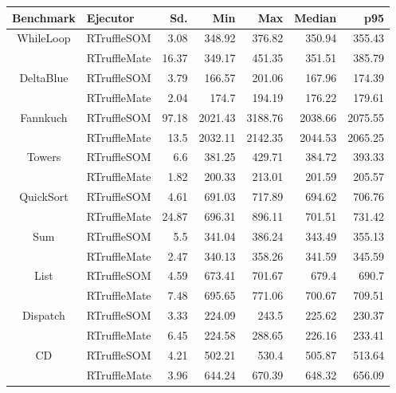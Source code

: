 \begin{center}
\begin{tabular}{ c | l r r r r r}
\toprule
\textbf{Benchmark} & \textbf{Ejecutor} & \textbf{Sd.} & \textbf{Min} & \textbf{Max} & \textbf{Median} & \textbf{p95}\\
\toprule

\multirow{2}{*}{ WhileLoop } & RTruffleSOM & 3.08 & 348.92 & 376.82 & 350.94 & 355.43 \\
& RTruffleMate & 16.37 & 349.17 & 451.35 & 351.51 & 385.79 \\
\midrule

\multirow{2}{*}{ DeltaBlue } & RTruffleSOM & 3.79 & 166.57 & 201.06 & 167.96 & 174.39 \\
& RTruffleMate & 2.04 & 174.7 & 194.19 & 176.22 & 179.61 \\
\midrule

\multirow{2}{*}{ Fannkuch } & RTruffleSOM & 97.18 & 2021.43 & 3188.76 & 2038.66 & 2075.55 \\
& RTruffleMate & 13.5 & 2032.11 & 2142.35 & 2044.53 & 2065.25 \\
\midrule

\multirow{2}{*}{ Towers } & RTruffleSOM & 6.6 & 381.25 & 429.71 & 384.72 & 393.33 \\
& RTruffleMate & 1.82 & 200.33 & 213.01 & 201.59 & 205.57 \\
\midrule

\multirow{2}{*}{ QuickSort } & RTruffleSOM & 4.61 & 691.03 & 717.89 & 694.62 & 706.76 \\
& RTruffleMate & 24.87 & 696.31 & 896.11 & 701.51 & 731.42 \\
\midrule

\multirow{2}{*}{ Sum } & RTruffleSOM & 5.5 & 341.04 & 386.24 & 343.49 & 355.13 \\
& RTruffleMate & 2.47 & 340.13 & 358.26 & 341.59 & 345.59 \\
\midrule

\multirow{2}{*}{ List } & RTruffleSOM & 4.59 & 673.41 & 701.67 & 679.4 & 690.7 \\
& RTruffleMate & 7.48 & 695.65 & 771.06 & 700.67 & 709.51 \\
\midrule

\multirow{2}{*}{ Dispatch } & RTruffleSOM & 3.33 & 224.09 & 243.5 & 225.62 & 230.37 \\
& RTruffleMate & 6.45 & 224.58 & 288.65 & 226.16 & 233.41 \\
\midrule

\multirow{2}{*}{ CD } & RTruffleSOM & 4.21 & 502.21 & 530.4 & 505.87 & 513.64 \\
& RTruffleMate & 3.96 & 644.24 & 670.39 & 648.32 & 656.09 \\
\midrule


\end{tabular}
\end{center}
